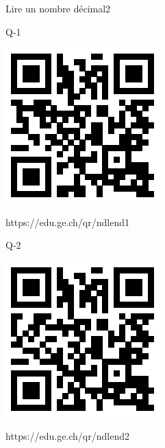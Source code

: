 \documentclass[a4paper,11pt]{report}
\begin{document}
	\begin{qmoodle}{Lire un nombre décimal}{2}{
	\begin{center}	
		Q-1

\includegraphics[scale=1]{media/qr/ndlend1}

\tiny{{https://edu.ge.ch/qr/ndlend1}}
\end{center}
	\begin{center}	
		Q-2

\includegraphics[scale=1]{media/qr/ndlend2}

\tiny{{https://edu.ge.ch/qr/ndlend2}}
\end{center}
}
\end{qmoodle}
\end{document}
